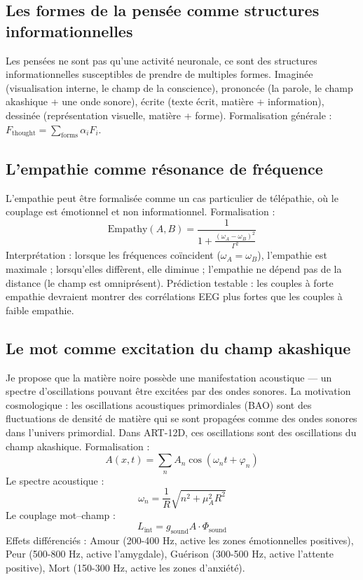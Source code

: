 \documentclass[11pt,a4paper]{article}
\begin{document}
\subsection{Les formes de la pensée comme structures informationnelles}
Les pensées ne sont pas qu'une activité neuronale, ce sont des structures informationnelles susceptibles de prendre de multiples formes. Imaginée (visualisation interne, le champ de la conscience), prononcée (la parole, le champ akashique + une onde sonore), écrite (texte écrit, matière + information), dessinée (représentation visuelle, matière + forme). Formalisation générale : $F_{\text{thought}} = \sum_{\text{forms}} \alpha_i F_i$.

\subsection{L'empathie comme résonance de fréquence}
L'empathie peut être formalisée comme un cas particulier de télépathie, où le couplage est émotionnel et non informationnel. Formalisation :
\begin{equation}
\text{Empathy}(A,B) = \frac{1}{1 + \frac{(\omega_A - \omega_B)^2}{\Gamma^2}}
\end{equation}
Interprétation : lorsque les fréquences coïncident ($\omega_A = \omega_B$), l'empathie est maximale ; lorsqu'elles diffèrent, elle diminue ; l'empathie ne dépend pas de la distance (le champ est omniprésent). Prédiction testable : les couples à forte empathie devraient montrer des corrélations EEG plus fortes que les couples à faible empathie.

\subsection{Le mot comme excitation du champ akashique}
Je propose que la matière noire possède une manifestation acoustique --- un spectre d'oscillations pouvant être excitées par des ondes sonores. La motivation cosmologique : les oscillations acoustiques primordiales (BAO) sont des fluctuations de densité de matière qui se sont propagées comme des ondes sonores dans l'univers primordial. Dans ART-12D, ces oscillations sont des oscillations du champ akashique. Formalisation :
\begin{equation}
A(x,t) = \sum_n A_n \cos(\omega_n t + \varphi_n)
\end{equation}
Le spectre acoustique :
\begin{equation}
\omega_n = \frac{1}{R} \sqrt{n^2 + \mu_A^2 R^2}
\end{equation}
Le couplage mot--champ :
\begin{equation}
L_{\text{int}} = g_{\text{sound}} A \cdot \Phi_{\text{sound}}
\end{equation}
Effets différenciés : Amour (200-400 Hz, active les zones émotionnelles positives), Peur (500-800 Hz, active l'amygdale), Guérison (300-500 Hz, active l'attente positive), Mort (150-300 Hz, active les zones d'anxiété).
\end{document}
